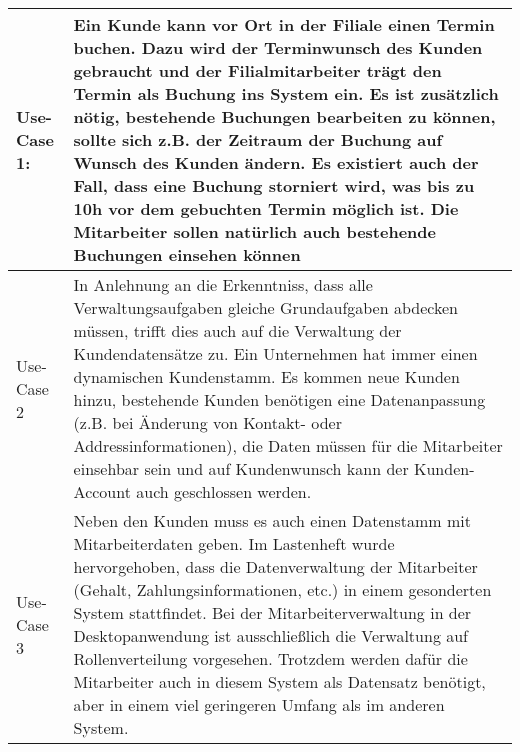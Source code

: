 \begin{tabular}{l | p{13cm}}
    \hline
    Use-Case 1: & Ein Kunde kann vor Ort in der Filiale einen Termin buchen. Dazu wird der Terminwunsch des Kunden gebraucht und der Filialmitarbeiter trägt den Termin als Buchung ins System ein. Es ist zusätzlich nötig, bestehende Buchungen bearbeiten zu können, sollte sich z.B. der Zeitraum der Buchung auf Wunsch des Kunden ändern. Es existiert auch der Fall, dass eine Buchung storniert wird, was bis zu 10h vor dem gebuchten Termin möglich ist. Die Mitarbeiter sollen natürlich auch bestehende Buchungen einsehen können\\
    \hline
    Use-Case 2 & In Anlehnung an die Erkenntniss, dass alle Verwaltungsaufgaben gleiche Grundaufgaben abdecken müssen, trifft dies auch auf die Verwaltung der Kundendatensätze zu. Ein Unternehmen hat immer einen dynamischen Kundenstamm. Es kommen neue Kunden hinzu, bestehende Kunden benötigen eine Datenanpassung (z.B. bei Änderung von Kontakt- oder Addressinformationen), die Daten müssen für die Mitarbeiter einsehbar sein und auf Kundenwunsch kann der Kunden-Account auch geschlossen werden.\\
    \hline
    Use-Case 3 & Neben den Kunden muss es auch einen Datenstamm mit Mitarbeiterdaten geben. Im Lastenheft wurde hervorgehoben, dass die Datenverwaltung der Mitarbeiter (Gehalt, Zahlungsinformationen, etc.) in einem gesonderten System stattfindet. Bei der Mitarbeiterverwaltung in der Desktopanwendung ist ausschließlich die Verwaltung auf Rollenverteilung vorgesehen. Trotzdem werden dafür die Mitarbeiter auch in diesem System als Datensatz benötigt, aber in einem viel geringeren Umfang als im anderen System.\\
    \hline
\end{tabular}

